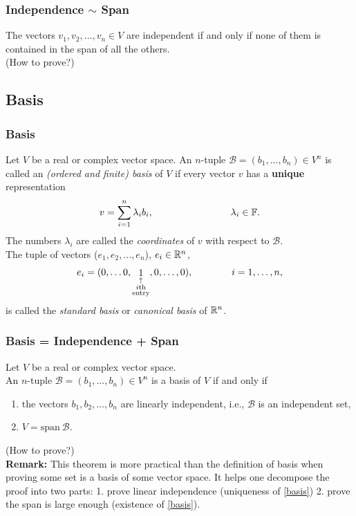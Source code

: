 \documentclass[12pt, t]{beamer}
\renewcommand{\emph}[1]{{\color{Turquoise3}\textsl{#1}}}
\newcommand{\myseries}[2]{$#1_1,#1_2,\dots,#1_#2$}
\newcommand{\nullspace}{~\\[15pt]}
\begin{document}
\begin{frame}
    \frametitle{Independence $\sim$ Span}
    The vectors \myseries{v}{n}$\in V$ are independent if and only if none of them is contained in the span of all the others.
    \\[15pt]
    (How to prove?)
\end{frame}

\subsection{Basis}
\begin{frame}
    \frametitle{Basis}
    Let $V$ be a real or complex vector space. An $n$-tuple $\mathcal{B}=(b_1,\ldots,b_n)\in V^n$ is called an \emph{(ordered and finite) basis} of $V$
    if every vector $v$ has a \textbf{unique} representation
    \begin{equation}
        v=\sum_{i=1}^{n}\lambda_ib_i,\qquad\qquad\qquad\qquad\lambda_i\in\mathbb{F}.\label{basis}
    \end{equation}
    The numbers $\lambda_i$ are called the \emph{coordinates} of $v$ with respect to $\mathcal{B}$.
    \\[15pt]
    The tuple of vectors (\myseries{e}{n}), $e_i\in\mathbb{R}^n$,
    \begin{equation*}
        e_i=(0,\ldots 0,\mathop{1}_{\begin{subarray}{c}
                \uparrow\\  i\text{th}\\ \text{entry}\end{subarray}},0,\ldots,0),\qquad\qquad i=1,\ldots,n,
    \end{equation*}
    is called the \emph{standard basis} or \emph{canonical basis} of $\mathbb{R}^n$.
\end{frame}

\begin{frame}
    \frametitle{Basis = Independence + Span}
    Let $V$ be a real or complex vector space.\\ An $n$-tuple $\mathcal{B}=(b_1,\ldots,b_n)\in V^n$ is a basis of $V$ if and only if
    \begin{enumerate}
        \item the vectors \myseries{b}{n} are linearly independent, i.e., $\mathcal{B}$ is an independent set,
        \item $V=\text{span}~\mathcal{B}.$
    \end{enumerate}
    (How to prove?)
    \nullspace
    \textbf{Remark:} This theorem is more practical than the definition of basis when proving some set is a basis of some vector space. It helps one decompose the proof into two parts: 1. prove linear independence (uniqueness of \eqref{basis}) 2. prove the span is large enough (existence of \eqref{basis}).
\end{frame}
\end{document}

